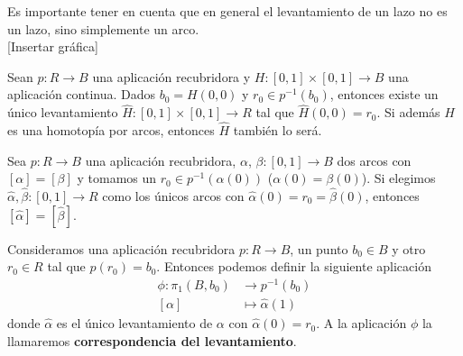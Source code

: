\begin{observacion}
    Es importante tener en cuenta que en general el levantamiento de un lazo no es un lazo, sino simplemente un arco.\\

    [Insertar gráfica]
\end{observacion}

\begin{lema}
    Sean $p:R \to B$ una aplicación recubridora y $H:[0,1]\times[0,1]\to B$ una aplicación continua. Dados $b_0=H(0,0)$ y $r_0\in p^{-1}(b_0)$, entonces existe un único levantamiento $\hat{H}:[0,1]\times[0,1]\to R$ tal que $\hat{H}(0,0) = r_0$. Si además $H$ es una homotopía por arcos, entonces $\hat{H}$ también lo será.
\end{lema}

\begin{coro}
    Sea $p:R\to B$ una aplicación recubridora, $\alpha$, $\beta:[0,1]\to B$ dos arcos con $[\alpha]=[\beta]$ y tomamos un $r_0\in p^{-1}(\alpha(0))$ ($\alpha(0)=\beta(0)$). Si elegimos $\hat{\alpha}, \hat{\beta}:[0,1]\to R$ como los únicos arcos con $\hat{\alpha}(0)=r_0=\hat{\beta}(0)$, entonces $[\hat{\alpha}] = [\hat{\beta}]$.
\end{coro}

\begin{definicion}
    Consideramos una aplicación recubridora $p:R\to B$, un punto $b_0\in B$ y otro $r_0\in R$ tal que $p(r_0)=b_0$. Entonces podemos definir la siguiente aplicación
    \begin{align*}
        \phi : \pi_1(B,b_0) & \to p^{-1}(b_0)\\
        [\alpha] & \mapsto \hat{\alpha}(1)
    \end{align*}
    donde $\hat{\alpha}$ es el único levantamiento de $\alpha$ con $\hat{\alpha}(0)=r_0$.
    A la aplicación $\phi$ la llamaremos \textbf{correspondencia del levantamiento}.
\end{definicion}

